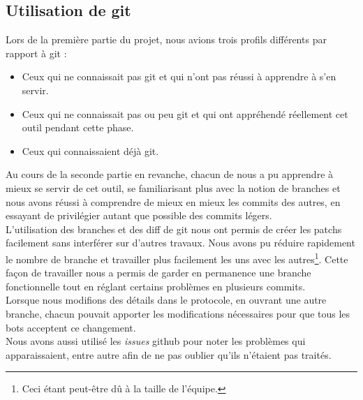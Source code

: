 \documentclass[a4paper,12pt]{article}
\begin{document}
\subsection{Utilisation de git}
Lors de la première partie du projet, nous avions trois profils différents par
rapport à git :
\begin{itemize}
\item Ceux qui ne connaissait pas git et qui n'ont pas réussi à apprendre à s'en
  servir.
\item Ceux qui ne connaissait pas ou peu git et qui ont appréhendé réellement
  cet outil pendant cette phase.
\item Ceux qui connaissaient déjà git.
\end{itemize}
Au cours de la seconde partie en revanche, chacun de nous a pu apprendre à mieux
se servir de cet outil, se familiarisant plus avec la notion de branches et nous
avons réussi à comprendre de mieux en mieux les commits des autres, en essayant
de privilégier autant que possible des commits légers.
\\
L'utilisation des branches et des diff de git nous ont permis de créer les
patchs facilement sans interférer sur d'autres travaux. Nous avons pu réduire
rapidement le nombre de branche et travailler plus facilement les uns avec les
autres\footnote{Ceci étant peut-être dû à la taille de l'équipe.}. Cette façon
de travailler nous a permis de garder en permanence une branche fonctionnelle
tout en réglant certains problèmes en plusieurs commits.
\\
Lorsque nous modifions des détails dans le protocole, en ouvrant une autre
branche, chacun pouvait apporter les modifications nécessaires pour que tous les
bots acceptent ce changement.
\\
Nous avons aussi utilisé les {\em issues} github pour noter les problèmes qui
apparaissaient, entre autre afin de ne pas oublier qu'ils n'étaient pas traités.
\end{document}
